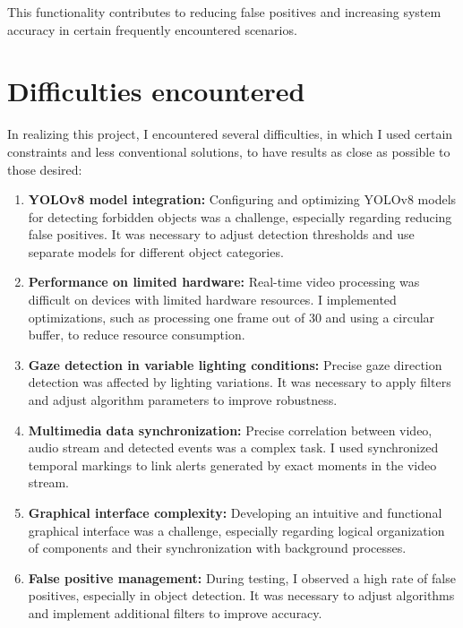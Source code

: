 \documentclass[12pt,a4paper]{article}
\begin{document}
This functionality contributes to reducing false positives and increasing system accuracy in certain frequently encountered scenarios.

\section{Difficulties encountered}

In realizing this project, I encountered several difficulties, in which I used certain constraints and less conventional solutions, to have results as close as possible to those desired:

\begin{enumerate}
    \item \textbf{YOLOv8 model integration:} Configuring and optimizing YOLOv8 models for detecting forbidden objects was a challenge, especially regarding reducing false positives. It was necessary to adjust detection thresholds and use separate models for different object categories.

    \item \textbf{Performance on limited hardware:} Real-time video processing was difficult on devices with limited hardware resources. I implemented optimizations, such as processing one frame out of 30 and using a circular buffer, to reduce resource consumption.

    \item \textbf{Gaze detection in variable lighting conditions:} Precise gaze direction detection was affected by lighting variations. It was necessary to apply filters and adjust algorithm parameters to improve robustness.

    \item \textbf{Multimedia data synchronization:} Precise correlation between video, audio stream and detected events was a complex task. I used synchronized temporal markings to link alerts generated by exact moments in the video stream.

    \item \textbf{Graphical interface complexity:} Developing an intuitive and functional graphical interface was a challenge, especially regarding logical organization of components and their synchronization with background processes.

    \item \textbf{False positive management:} During testing, I observed a high rate of false positives, especially in object detection. It was necessary to adjust algorithms and implement additional filters to improve accuracy.


\end{enumerate}
\end{document}
